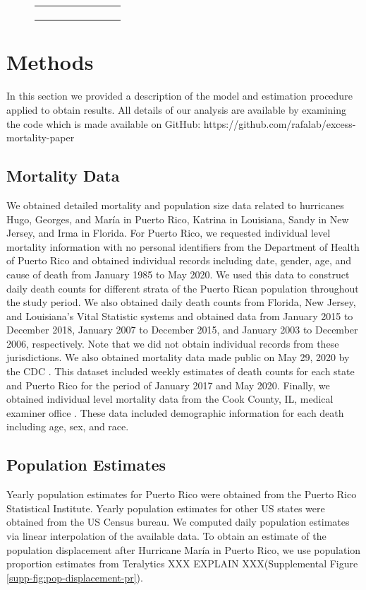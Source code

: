 \documentclass[11pt]{article}
\begin{document}
\begin{figure}[ht]
\begin{tabular}{lll}
\begin{subfigure}[t]{0.3\linewidth}
	\end{subfigure}\\
	\end{tabular}
	\caption{}
	\label{fig:cook-white-v-black}
\end{figure}


\section{Methods}
\label{sec:methods}

In this section we provided a description of the model and estimation procedure applied to obtain results. All details of our analysis are available by examining the code which is made available on GitHub: https://github.com/rafalab/excess-mortality-paper

\subsection{Mortality Data}
\label{subsec:mortality-data}
We obtained detailed mortality and population size data related to hurricanes Hugo, Georges, and Mar\'ia in Puerto Rico, Katrina in Louisiana, Sandy in New Jersey, and Irma in Florida. For Puerto Rico, we requested individual level mortality information with no personal identifiers from the Department of Health of Puerto Rico and obtained individual records including date, gender, age, and cause of death from January 1985 to May 2020. We used this data to construct daily death counts for different strata of the Puerto Rican population throughout the study period. We also obtained daily death counts from Florida, New Jersey, and Louisiana’s Vital Statistic systems and obtained data from January 2015 to December 2018, January 2007 to December 2015, and January 2003 to December 2006, respectively. Note that we did not obtain individual records from these jurisdictions. We also obtained mortality data made public on May 29, 2020 by the CDC  \cite{cdc2020covid19}. This dataset included weekly estimates of death counts for each state and Puerto Rico for the period of January 2017 and May 2020. 
Finally, we obtained individual level mortality data from the Cook County, IL, medical examiner office \cite{cookcovid19}. These data included demographic information for each death including age, sex, and race.

\subsection{Population Estimates}
\label{subsec:population}
Yearly population estimates for Puerto Rico were obtained from the Puerto Rico Statistical Institute. Yearly population estimates for other US states were obtained from the US Census bureau. We computed daily population estimates via linear interpolation of the available data. To obtain an estimate of the population displacement after Hurricane Mar\'ia in Puerto Rico, we use population proportion estimates from Teralytics XXX EXPLAIN XXX(Supplemental Figure \ref{supp-fig:pop-displacement-pr}).
\end{document}
